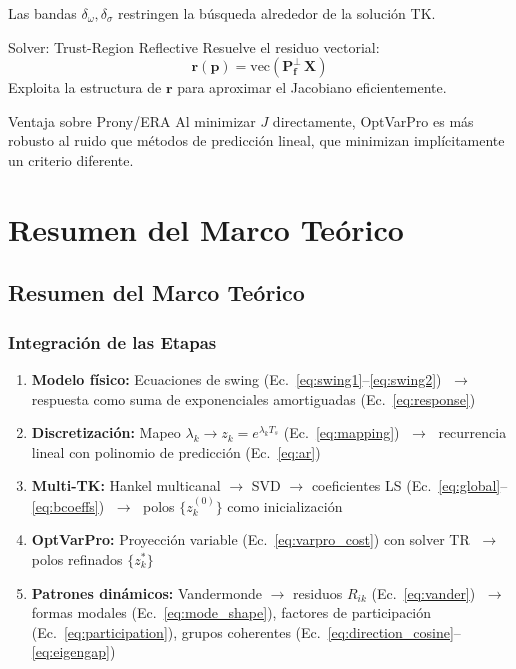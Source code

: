 Las bandas $\delta_\omega, \delta_\sigma$ restringen la búsqueda alrededor de la solución TK.

\begin{block}{Solver: Trust-Region Reflective}
    Resuelve el residuo vectorial:
    \begin{equation}
        \mathbf{r}(\mathbf{p}) = \mathrm{vec}\!\left(\mathbf{P}_{\mathbf{f}}^\perp\,\mathbf{X}\right)
    \end{equation}
    Exploita la estructura de $\mathbf{r}$ para aproximar el Jacobiano eficientemente.
\end{block}

\begin{exampleblock}{Ventaja sobre Prony/ERA}
    Al minimizar $J$ directamente, OptVarPro es más robusto al ruido que métodos de predicción lineal, que minimizan implícitamente un criterio diferente.
\end{exampleblock}

\section{Resumen del Marco Teórico}

\subsection{Resumen del Marco Teórico}
\subsubsection{Integración de las Etapas}

\begin{enumerate}
    \item \textbf{Modelo físico:} Ecuaciones de swing (Ec.~\ref{eq:swing1}--\ref{eq:swing2})
          $\;\to\;$ respuesta como suma de exponenciales amortiguadas (Ec.~\ref{eq:response})
    
    \item \textbf{Discretización:} Mapeo $\lambda_k \to z_k = e^{\lambda_k T_s}$ (Ec.~\ref{eq:mapping})
          $\;\to\;$ recurrencia lineal con polinomio de predicción (Ec.~\ref{eq:ar})
    
    \item \textbf{Multi-TK:} Hankel multicanal $\to$ SVD $\to$ coeficientes LS (Ec.~\ref{eq:global}--\ref{eq:bcoeffs})
          $\;\to\;$ polos $\{z_k^{(0)}\}$ como inicialización
    
    \item \textbf{OptVarPro:} Proyección variable (Ec.~\ref{eq:varpro_cost}) con solver TR
          $\;\to\;$ polos refinados $\{z_k^*\}$
    
    \item \textbf{Patrones dinámicos:} Vandermonde $\to$ residuos $R_{ik}$ (Ec.~\ref{eq:vander})
          $\;\to\;$ formas modales (Ec.~\ref{eq:mode_shape}), factores de participación (Ec.~\ref{eq:participation}),
          grupos coherentes (Ec.~\ref{eq:direction_cosine}--\ref{eq:eigengap})
\end{enumerate}

